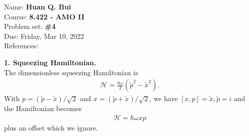 \documentclass{article}
\theoremstyle{definition}
\newcommand{\ham}{\mathcal{H}}
\newcommand{\f}[2]{\frac{#1}{#2}}
\begin{document}
\begin{framed}
\noindent Name: \textbf{Huan Q. Bui}\\
Course: \textbf{8.422 - AMO II}\\
Problem set: \textbf{\#4}\\
Due: Friday, Mar 10, 2022\\
References: 
\end{framed}
	
	
\noindent \textbf{1. Squeezing Hamiltonian.} \\

\noindent The dimensionless squeezing Hamiltonian is 
\begin{align*}
\ham = \f{\hbar \omega}{2} (\tilde{p}^2 - \tilde{x}^2). 
\end{align*}
With $p = (\tilde{p}- \tilde{x}) / \sqrt{2}$ and $x = (\tilde{p} + \tilde{x})/\sqrt{2}$, we have $[x,p] = \tilde{x}, \tilde{p} = i$ and the Hamiltonian becomes
\begin{align*}
\ham = \hbar \omega xp
\end{align*}
plus an offset which we ignore. 
\end{document}
